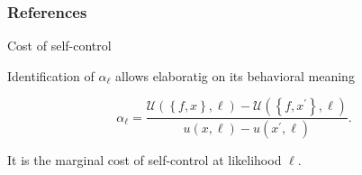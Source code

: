 \documentclass[usenames,dvipsnames,aspectratio=169,11pt, envcountsect]{beamer}
\begin{document}
\begin{comment}

\begin{frame}\frametitle{Model}

	Primitives:

	\vfill

	\begin{itemize}
		\item
		      compact outcome set \(X\);
		      \pause
		\item
		      finite state spaces \(S\) and prior \( p \in \Delta \left( S \right) \);
		\item Blackwell experiment \( \pi : S \longrightarrow \Delta \left( M \right) \) where \( m \in M \) is a message;
		\item individual chooses action \(f: S \longrightarrow X \).
	\end{itemize}

	\vfill

	Message \( m \) from experiment \( \pi \) induces a posterior \( p_{\pi, m} \).

	\vfill

	Choosing action \( f \) at posterior \( p_{\pi, m} \) induces utility

	\[
		U \left( f, p_{\pi, m} \right) = \sum_{s} u \left( f_{s} ; p_{\pi, m} \right) p_{\pi, m} \left( s \right) +\alpha _{\pi, m} \sum_{s} u \left( f_{s} ; p^{*}_{\pi, m} \right) p^{*}_{\pi, m} \left( s \right) .
	\]

\end{frame}

\end{comment}

\begin{frame}

	\frametitle{References}

	
	


\end{frame}

\appendix

\begin{frame}{Cost of self-control}

	Identification of \( \alpha_{\ell} \) allows elaboratig on its behavioral meaning

	\vfill

	\[
		\alpha_{\ell} = \frac{\mathcal{U} \left( \left\{f, x \right\}, \ell \right) - \mathcal{U} \left( \left\{f, x^{\prime} \right\}, \ell \right) }{u \left( x , \ell \right) - u \left( x^{\prime} , \ell \right)} .
	\]

	\vfill

	It is the marginal cost of self-control at likelihood \( \ell \).

\end{frame}
\end{document}
